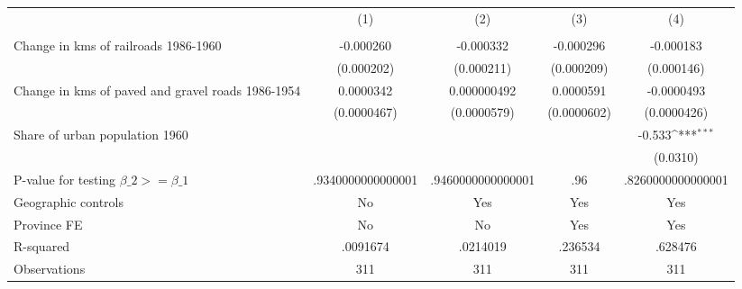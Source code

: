 {
\def\sym#1{\ifmmode^{#1}\else\(^{#1}\)\fi}
\begin{tabular}{l*{4}{c}}
\hline\hline
                &\multicolumn{1}{c}{(1)}&\multicolumn{1}{c}{(2)}&\multicolumn{1}{c}{(3)}&\multicolumn{1}{c}{(4)}\\
                &\multicolumn{1}{c}{}&\multicolumn{1}{c}{}&\multicolumn{1}{c}{}&\multicolumn{1}{c}{}\\
\hline
Change in kms of railroads 1986-1960&-0.000260         &-0.000332         &-0.000296         &-0.000183         \\
                &(0.000202)         &(0.000211)         &(0.000209)         &(0.000146)         \\
[1em]
Change in kms of paved and gravel roads 1986-1954&0.0000342         &0.000000492         &0.0000591         &-0.0000493         \\
                &(0.0000467)         &(0.0000579)         &(0.0000602)         &(0.0000426)         \\
[1em]
Share of urban population 1960&                  &                  &                  &   -0.533\sym{***}\\
                &                  &                  &                  & (0.0310)         \\
\hline
P-value for testing $\beta\_{2} >= \beta\_{1}$&.9340000000000001         &.9460000000000001         &      .96         &.8260000000000001         \\
Geographic controls&       No         &      Yes         &      Yes         &      Yes         \\
Province FE     &       No         &       No         &      Yes         &      Yes         \\
R-squared       & .0091674         & .0214019         &  .236534         &  .628476         \\
Observations    &      311         &      311         &      311         &      311         \\
\hline\hline
\end{tabular}
}
